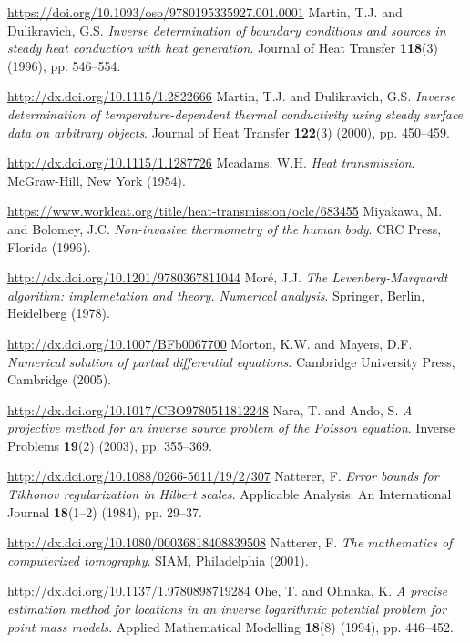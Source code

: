\begin{thebibliography}{301}
\url{https://doi.org/10.1093/oso/9780195335927.001.0001}
%
%
 Martin, T.J. and Dulikravich, G.S. {\it Inverse determination of boundary conditions and sources in steady heat conduction with heat generation}. Journal of Heat Transfer {\bf 118}(3) (1996), pp. 546--554.

\url{http://dx.doi.org/10.1115/1.2822666}
%
%
 Martin, T.J. and Dulikravich, G.S. {\it Inverse determination of temperature-dependent thermal conductivity using steady surface data on arbitrary objects}. Journal of Heat Transfer {\bf 122}(3) (2000), pp. 450--459.

\url{http://dx.doi.org/10.1115/1.1287726} 
%
%
 Mcadams, W.H. {\it Heat transmission}. McGraw-Hill, New York (1954). 

\url{https://www.worldcat.org/title/heat-transmission/oclc/683455} 
%
%
 Miyakawa, M. and Bolomey, J.C. {\it Non-invasive thermometry of the human body}. CRC Press, Florida (1996). 

\url{http://dx.doi.org/10.1201/9780367811044} 
%
%
 Mor\'e, J.J. {\it The Levenberg-Marquardt algorithm: implemetation and theory. Numerical analysis}. Springer, Berlin, Heidelberg (1978). 

\url{http://dx.doi.org/10.1007/BFb0067700}
%
%
 Morton, K.W. and Mayers, D.F. {\it Numerical solution of partial differential equations}. Cambridge University Press, Cambridge (2005). 

\url{http://dx.doi.org/10.1017/CBO9780511812248} 
%
%
 Nara, T. and Ando, S. {\it A projective method for an inverse source problem of the Poisson equation}. Inverse Problems {\bf 19}(2) (2003), pp. 355--369.

\url{http://dx.doi.org/10.1088/0266-5611/19/2/307}
%
%
 Natterer, F. {\it Error bounds for Tikhonov regularization in Hilbert scales}. Applicable Analysis: An International Journal {\bf 18}(1--2) (1984), pp. 29--37.

\url{http://dx.doi.org/10.1080/00036818408839508}
%
%
 Natterer, F. {\it The mathematics of computerized tomography}. SIAM, Philadelphia (2001). 

\url{http://dx.doi.org/10.1137/1.9780898719284}
%
%
 Ohe, T. and Ohnaka, K. {\it A precise estimation method for locations in an inverse logarithmic potential problem for point mass models}. Applied Mathematical Modelling {\bf 18}(8) (1994), pp. 446--452.


\end{thebibliography}
